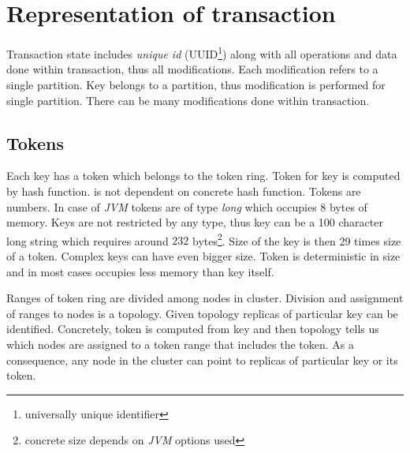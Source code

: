 
\section{Representation of transaction}
Transaction state includes \emph{unique id} (UUID\footnote{universally unique identifier}) along with all operations and data done within transaction, thus all modifications. 
Each modification refers to a single partition. Key belongs to a partition, thus modification is performed for single partition. There can be many modifications done within transaction. 

\subsection{Tokens}

Each key has a token which belongs to the token ring. Token for key is computed by hash function. \mpp is not dependent on concrete hash function. Tokens are numbers. In case of \emph{JVM} tokens are of type \emph{long} which occupies 8 bytes of memory. Keys are not restricted by any type, thus key can be a 100 character long string which requires around $232$ bytes\footnote{concrete size depends on \emph{JVM} options used}. Size of the key is then 29 times size of a token. Complex keys can have even bigger size. Token is deterministic in size and in most cases occupies less memory than key itself.

Ranges of token ring are divided among nodes in cluster. Division and assignment of ranges to nodes is a topology. Given topology replicas of particular key can be identified. Concretely, token is computed from key and then topology tells us which nodes are assigned to a token range that includes the token. As a consequence, any node in the cluster can point to replicas of particular key or its token.


